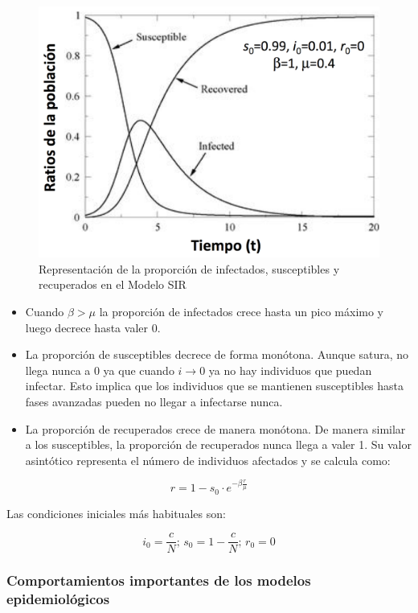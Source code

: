\documentclass[]{article}
\begin{document}
\begin{figure}[htbp]
\centering
\includegraphics{../images/tema08/graficaSIR.png}
\caption{Representación de la proporción de infectados, susceptibles y
recuperados en el Modelo SIR}
\end{figure}

\begin{itemize}
\itemsep1pt\parskip0pt
\item
  Cuando \(\beta>\mu\) la proporción de infectados crece hasta un pico
  máximo y luego decrece hasta valer 0.
\item
  La proporción de susceptibles decrece de forma monótona. Aunque
  satura, no llega nunca a 0 ya que cuando \(i \to 0\) ya no hay
  individuos que puedan infectar. Esto implica que los individuos que se
  mantienen susceptibles hasta fases avanzadas pueden no llegar a
  infectarse nunca.
\item
  La proporción de recuperados crece de manera monótona. De manera
  similar a los susceptibles, la proporción de recuperados nunca llega a
  valer 1. Su valor asintótico representa el número de individuos
  afectados y se calcula como:
\end{itemize}

\[r = 1- s_0 \cdot e^{-\beta \frac{r}{\mu}}\]

Las condiciones iniciales más habituales son:

\[i_0 = \frac{c}{N}\text{;  }s_0 = 1- \frac{c}{N}\text{;  }r_0 = 0\]

\subsubsection{Comportamientos importantes de los modelos
epidemiológicos}\label{comportamientos-importantes-de-los-modelos-epidemioluxf3gicos}
\end{document}

